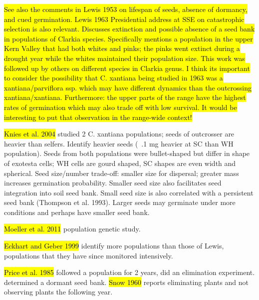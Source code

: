 \documentclass[12pt, oneside, titlepage]{article}   	%
\begin{document}
{\hl{See also the comments in Lewis 1953 on lifespan of seeds, absence of dormancy, and cued germination. Lewis 1963 Presidential address at SSE on catastrophic selection is also relevant. Discusses extinction and possible absence of a seed bank in populations of Clarkia species. Specifically mentions a population in the upper Kern Valley that had both whites and pinks; the pinks went extinct during a drought year while the whites maintained their population size. This work was followed up by others on different species in Clarkia genus. I think its important to consider the possibility that C. xantiana being studied in 1963 was a xantiana/parviflora ssp. which may have different dynamics than the outcrossing xantiana/xantiana. Furthermore: the upper parts of the range have the highest rates of germination which may also trade off with low survival. It would be interesting to put that observation in the range-wide context!} 

\hl{Knies et al. 2004} studied 2 C. xantiana populations; seeds of outcrosser are heavier than selfers. Identify heavier seeds (~.1 mg heavier at SC than WH population). Seeds from both populations were bullet-shaped but differ in shape of exotesta cells; WH cells are gourd shaped, SC shapes are even width and spherical. Seed size/number trade-off: smaller size for dispersal; greater mass increases germination probability. Smaller seed size also facilitates seed integration into soil seed bank. Small seed size is also correlated with a persistent seed bank (Thompson et al. 1993). Larger seeds may germinate under more conditions and perhaps have smaller seed bank.

\hl{Moeller et al. 2011} population genetic study. 

\hl{Eckhart and Geber 1999} identify more populations than those of Lewis, populations that they have since monitored intensively. 

\hl{Price et al. 1985} followed a population for 2 years, did an elimination experiment. determined a dormant seed bank.  \hl{Snow 1960} reports eliminating plants and not observing plants the following year. 

}
\end{document}
